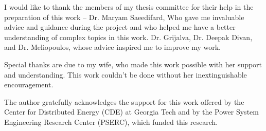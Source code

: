 
\begin{acknowledgments}

I would like to thank the members of my thesis committee for their help in the preparation of this work -- Dr. Maryam Saeedifard, Who gave me invaluable advice and guidance during the project and who helped me have a better understanding of complex topics in this work. Dr. Grijalva, Dr. Deepak Divan, and Dr. Meliopoulos, whose advice inspired me to improve my work. 

Special thanks are due to my wife, who made this work possible with her support and understanding. This work couldn't be done without her inextinguishable encouragement.

The author gratefully acknowledges the support for this work offered by the Center for Distributed Energy (CDE) at Georgia Tech and by the Power System Engineering Research Center (PSERC), which funded this research. 

\end{acknowledgments}
